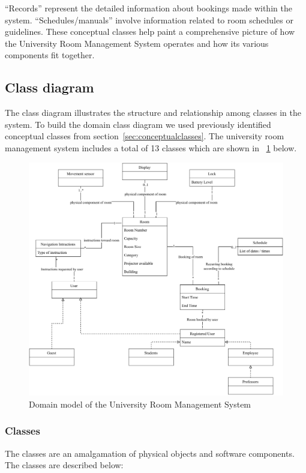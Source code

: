 \documentclass[article,onecolumn]{IEEEtran}
\begin{document}
	``Records'' represent the detailed information about bookings made within the system. ``Schedules/manuals'' involve information related to room schedules or guidelines. These conceptual classes help paint a comprehensive picture of how the University Room Management System operates and how its various components fit together.

\subsection{Class diagram}
	The class diagram illustrates the structure and relationship among classes in the system. To build the domain class diagram we used previously identified conceptual classes from section~\ref{sec:conceptualclasses}. The university room management system includes a total of 13 classes which are shown in \figurename~\ref{fig:classdiagram} below.

	\begin{figure}[H]
		\centering
		\includegraphics[width=1\textwidth]{Figures/DomainModel.pdf}
		\caption{Domain model of the University Room Management System}
		\label{fig:classdiagram}
	\end{figure}

	\subsubsection*{Classes} \label{sec:classes}
		The classes are an amalgamation of physical objects and software components. The classes are described below:
		
\end{document}
